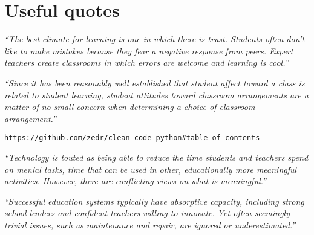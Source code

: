 \documentclass[10pt]{article}
\begin{document}
\section{Useful quotes}
 
\begin{center} 
\emph{``The best climate for learning is one in which there is trust. Students often don’t like to make mistakes because they fear a negative response from peers. Expert teachers create classrooms in which errors are welcome and learning is cool.''} \cite{Hat12}
\end{center}
 
\begin{center} 
\emph{``Since it has been reasonably well established that student affect toward a class is related to student learning, student attitudes toward classroom arrangements are a matter of no small concern when determining a choice of classroom arrangement.''} \cite{MM78}
\end{center}

\begin{verbatim}
https://github.com/zedr/clean-code-python#table-of-contents
\end{verbatim}


\begin{center} 
\emph{``Technology is touted as being able to reduce the time students and teachers spend on menial tasks, time that can be used in other, educationally more meaningful activities. However, there are conflicting views on what is meaningful.''} \cite[p. 11]{Unesco23}
\end{center}

\begin{center} 
\emph{``Successful education systems typically have absorptive capacity, including strong school leaders and confident teachers willing to innovate. Yet often seemingly trivial issues, such as maintenance and repair, are ignored or underestimated.''} \cite[p. 17]{Unesco23}
\end{center}
\end{document}
